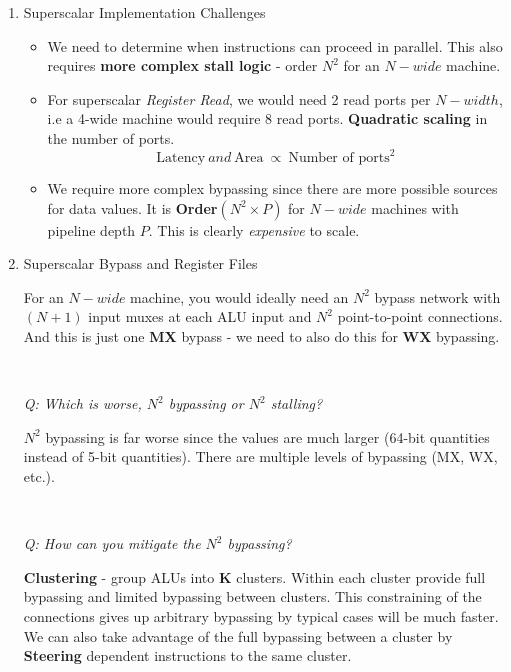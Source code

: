 \documentclass[12pt]{article}
\newenvironment{QandA}{\begin{enumerate}[label=\bfseries\arabic*.]\bfseries}
                      {\end{enumerate}}
\newenvironment{answered}{\par\quad\normalfont}{}
\begin{document}
\begin{QandA}
\item Superscalar Implementation Challenges
\begin{answered}
\vspace{-0.85cm}
\begin{itemize}
    \item We need to determine when instructions can proceed in parallel. This also requires \textbf{more complex stall logic} - order \textbf{$N^{2}$} for an $N-wide$ machine. 
    \item For superscalar \textit{Register Read}, we would need 2 read ports per $N-width$, i.e a 4-wide machine would require 8 read ports. \textbf{Quadratic scaling} in the number of ports. 
    \begin{equation*}
        \text{Latency}\ \textit{and}\ \text{Area}\ \propto\ \text{Number of ports}^{2}
    \end{equation*}
    \item We require more complex bypassing since there are more possible sources for data values. It is \textbf{Order$(N^{2} \times P)$} for $N-wide$ machines with pipeline depth $P$. This is clearly \textit{expensive} to scale. 
\end{itemize}
\end{answered}

\item Superscalar Bypass and Register Files 
\begin{answered}
For an $N-wide$ machine, you would ideally need an $N^{2}$ bypass network with $(N+1)$ input muxes at each ALU input and $N^{2}$ point-to-point connections. And this is just one \textbf{MX} bypass - we need to also do this for \textbf{WX} bypassing. 

\ 

\textit{Q: Which is worse, $N^{2}$ bypassing or $N^{2}$ stalling?}

\quad $N^{2}$ bypassing is far worse since the values are much larger (64-bit quantities instead of 5-bit quantities). There are multiple levels of bypassing (MX, WX, etc.).

\ 

\textit{Q: How can you mitigate the $N^{2}$ bypassing?}

\quad \textbf{Clustering} - group ALUs into \textbf{K} clusters. Within each cluster provide full bypassing and limited bypassing between clusters. This constraining of the connections gives up arbitrary bypassing by typical cases will be much faster. We can also take advantage of the full bypassing between a cluster by \textbf{Steering} dependent instructions to the same cluster. 


\end{answered}
\end{QandA}
\end{document}
